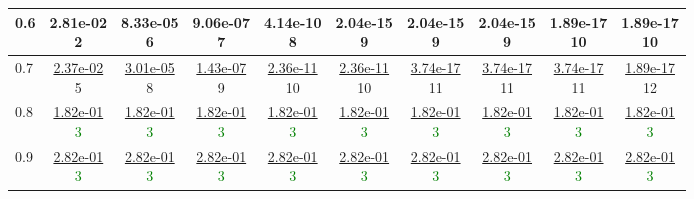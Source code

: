\begin{table}[H]
\begin{tabular}{|l||c|c|c|c|c|c|c|c|c|}
\hline
 0.6 & \makecell{2.81e-02 \\ 2} & \makecell{8.33e-05 \\ 6} & \makecell{9.06e-07 \\ 7} & \makecell{4.14e-10 \\ 8} & \makecell{2.04e-15 \\ 9} & \makecell{2.04e-15 \\ 9} & \makecell{2.04e-15 \\ 9} & \makecell{1.89e-17 \\ 10} & \makecell{1.89e-17 \\ 10} \\
\hline
 0.7 & \makecell{\ul{2.37e-02} \\ 5} & \makecell{\ul{3.01e-05} \\ 8} & \makecell{\ul{1.43e-07} \\ 9} & \makecell{\ul{2.36e-11} \\ 10} & \makecell{\ul{2.36e-11} \\ 10} & \makecell{\ul{3.74e-17} \\ 11} & \makecell{\ul{3.74e-17} \\ 11} & \makecell{\ul{3.74e-17} \\ 11} & \makecell{\ul{1.89e-17} \\ 12} \\
\hline
 0.8 & \makecell{\ul{1.82e-01} \\ \textcolor{Green}{3}} & \makecell{\ul{1.82e-01} \\ \textcolor{Green}{3}} & \makecell{\ul{1.82e-01} \\ \textcolor{Green}{3}} & \makecell{\ul{1.82e-01} \\ \textcolor{Green}{3}} & \makecell{\ul{1.82e-01} \\ \textcolor{Green}{3}} & \makecell{\ul{1.82e-01} \\ \textcolor{Green}{3}} & \makecell{\ul{1.82e-01} \\ \textcolor{Green}{3}} & \makecell{\ul{1.82e-01} \\ \textcolor{Green}{3}} & \makecell{\ul{1.82e-01} \\ \textcolor{Green}{3}} \\
\hline
 0.9 & \makecell{\ul{2.82e-01} \\ \textcolor{Green}{3}} & \makecell{\ul{2.82e-01} \\ \textcolor{Green}{3}} & \makecell{\ul{2.82e-01} \\ \textcolor{Green}{3}} & \makecell{\ul{2.82e-01} \\ \textcolor{Green}{3}} & \makecell{\ul{2.82e-01} \\ \textcolor{Green}{3}} & \makecell{\ul{2.82e-01} \\ \textcolor{Green}{3}} & \makecell{\ul{2.82e-01} \\ \textcolor{Green}{3}} & \makecell{\ul{2.82e-01} \\ \textcolor{Green}{3}} & \makecell{\ul{2.82e-01} \\ \textcolor{Green}{3}} \\

\end{tabular}
\end{table}
